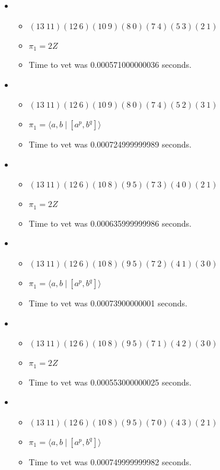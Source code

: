 \documentclass{article}
\begin{document}
\begin{itemize}
\begin{itemize}
\end{itemize}
\item \begin{itemize}
      \item $(13\ 11)(12\ 6)(10\ 9)(8\ 0)(7\ 4)(5\ 3)(2\ 1)$
      \item $\pi_1 =2 Z$
      \item Time to vet was 0.000571000000036 seconds.
\end{itemize}
\item \begin{itemize}
      \item $(13\ 11)(12\ 6)(10\ 9)(8\ 0)(7\ 4)(5\ 2)(3\ 1)$
      \item $\pi_1 = \langle a,b\ |\ [a^p,b^q]\rangle$
      \item Time to vet was 0.000724999999989 seconds.
\end{itemize}
\item \begin{itemize}
      \item $(13\ 11)(12\ 6)(10\ 8)(9\ 5)(7\ 3)(4\ 0)(2\ 1)$
      \item $\pi_1 =2 Z$
      \item Time to vet was 0.000635999999986 seconds.
\end{itemize}
\item \begin{itemize}
      \item $(13\ 11)(12\ 6)(10\ 8)(9\ 5)(7\ 2)(4\ 1)(3\ 0)$
      \item $\pi_1 = \langle a,b\ |\ [a^p,b^q]\rangle$
      \item Time to vet was 0.00073900000001 seconds.
\end{itemize}
\item \begin{itemize}
      \item $(13\ 11)(12\ 6)(10\ 8)(9\ 5)(7\ 1)(4\ 2)(3\ 0)$
      \item $\pi_1 =2 Z$
      \item Time to vet was 0.000553000000025 seconds.
\end{itemize}
\item \begin{itemize}
      \item $(13\ 11)(12\ 6)(10\ 8)(9\ 5)(7\ 0)(4\ 3)(2\ 1)$
      \item $\pi_1 = \langle a,b\ |\ [a^p,b^q]\rangle$
      \item Time to vet was 0.000749999999982 seconds.
\end{itemize}

\end{itemize}
\end{document}
